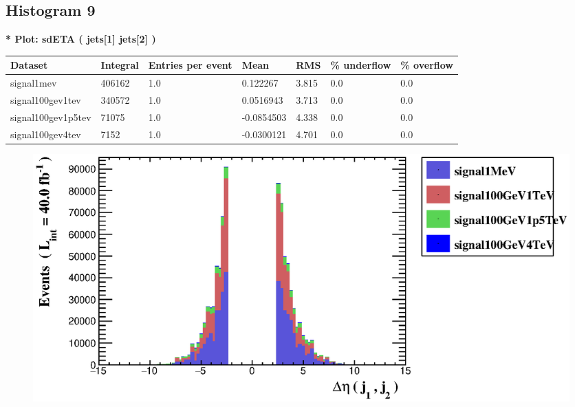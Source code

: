 \documentclass[a4paper, 10pt]{article}
\begin{document}
\subsection{ Histogram 9}

\textbf{* Plot: sdETA ( jets[1] jets[2] ) }\\
   \begin{table}[H]
  \begin{center}
    \begin{tabular}{|m{23.0mm}|m{23.0mm}|m{18.0mm}|m{19.0mm}|m{19.0mm}|m{19.0mm}|m{19.0mm}|}
      \hline
      {\cellcolor{yellow}         Dataset}& {\cellcolor{yellow}         Integral}& {\cellcolor{yellow}         Entries per event}& {\cellcolor{yellow}         Mean}& {\cellcolor{yellow}         RMS}& {\cellcolor{yellow}         \% underflow}& {\cellcolor{yellow}         \% overflow}\\
      \hline
      {\cellcolor{white}         signal1mev}& {\cellcolor{white}         406162}& {\cellcolor{white}         1.0}& {\cellcolor{white}         0.122267}& {\cellcolor{white}         3.815}& {\cellcolor{green}         0.0}& {\cellcolor{green}         0.0}\\
      \hline
      {\cellcolor{white}         signal100gev1tev}& {\cellcolor{white}         340572}& {\cellcolor{white}         1.0}& {\cellcolor{white}         0.0516943}& {\cellcolor{white}         3.713}& {\cellcolor{green}         0.0}& {\cellcolor{green}         0.0}\\
      \hline
      {\cellcolor{white}         signal100gev1p5tev}& {\cellcolor{white}         71075}& {\cellcolor{white}         1.0}& {\cellcolor{white}         -0.0854503}& {\cellcolor{white}         4.338}& {\cellcolor{green}         0.0}& {\cellcolor{green}         0.0}\\
      \hline
      {\cellcolor{white}         signal100gev4tev}& {\cellcolor{white}         7152}& {\cellcolor{white}         1.0}& {\cellcolor{white}         -0.0300121}& {\cellcolor{white}         4.701}& {\cellcolor{green}         0.0}& {\cellcolor{green}         0.0}\\
\hline
    \end{tabular}
  \end{center}
\end{table}

\begin{figure}[H]
  \begin{center}
    \includegraphics[scale=0.45]{selection_8.eps}\\
\caption{   }
  \end{center}
\end{figure}
      \newpage
\end{document}

